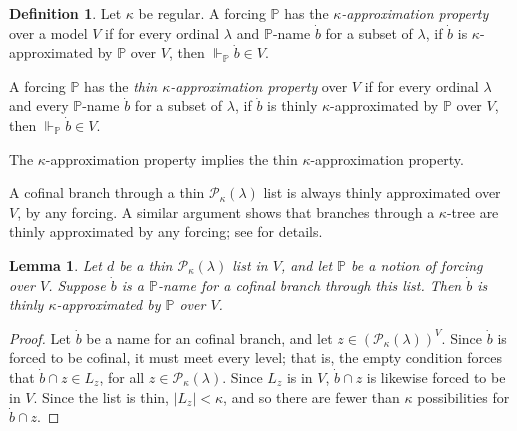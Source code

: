 \documentclass[psamsfonts]{amsart}
\newtheorem{lemma}[thm]{Lemma}
\theoremstyle{definition}
\newtheorem{defn}[thm]{Definition}
\newcommand{\PP}{\mathbb{P}}
\newcommand{\la}{\lambda}
\newcommand{\ka}{\kappa}
\newcommand{\mc}{\mathcal}
\newcommand{\forces}{\Vdash}
\numberwithin{equation}{section}
\begin{document}
\begin{defn}\label{def:ka-approx}
	Let $\ka$ be regular. A forcing $\PP$ has the \emph{$\ka$-approximation property} over a model $V$ if for every ordinal $\la$ and $\PP$-name $\dot{b}$ for a subset of $\la$, if $\dot{b}$ is $\ka$-approximated by $\PP$ over $V$, then $\forces_{\PP}\dot{b} \in V$.
	
	A forcing $\PP$ has the \emph{thin $\ka$-approximation property} over $V$ if for every ordinal $\la$ and every $\PP$-name $\dot{b}$ for a subset of $\la$, if $\dot{b}$ is thinly $\ka$-approximated by $\PP$ over $V$, then $\forces_{\PP}\dot{b} \in V$.
\end{defn}

The $\ka$-approximation property implies the thin $\ka$-approximation property. 

A cofinal branch through a thin $\mc{P}_\ka(\la)$ list is always thinly approximated over $V$, by any forcing. A similar argument shows that branches through a $\ka$-tree are thinly approximated by any forcing; see \cite[Section 2]{UngerAtrees} for details.

\begin{lemma}\label{lem:branchapprox}
	Let $d$ be a thin $\mc{P}_\ka(\la)$ list in $V$, and let $\mathbb{P}$ be a notion of forcing over $V$. Suppose $\dot{b}$ is a $\PP$-name for a cofinal branch through this list. Then $\dot{b}$ is thinly $\ka$-approximated by $\PP$ over $V$.
\end{lemma}
\begin{proof}
	Let $\dot{b}$ be a name for an cofinal branch, and let $z \in (\mc{P}_\ka(\la))^V$. Since $\dot{b}$ is forced to be cofinal, it must meet every level; that is, the empty condition forces that $\dot{b} \cap z \in L_z$, for all $z \in \mc{P}_\ka(\la)$. Since $L_z$ is in $V$, $\dot{b}\cap z$ is likewise forced to be in $V$. Since the list is thin, $|L_z| < \ka$, and so there are fewer than $\ka$ possibilities for $\dot{b}\cap z$.
\end{proof}
\end{document}
